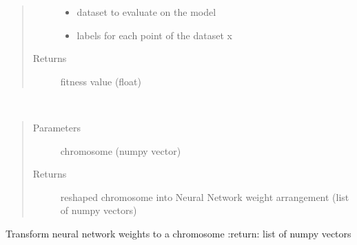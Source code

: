 \documentclass[letterpaper,10pt,english]{sphinxmanual}
\begin{document}
\begin{fulllineitems}
\begin{fulllineitems}
\begin{quote}
\begin{description}
\begin{itemize}
\item {} 
 \textendash{} dataset to evaluate on the model

\item {} 
 \textendash{} labels for each point of the dataset x

\end{itemize}

\item[{Returns}] \leavevmode
fitness value (float)

\end{description}\end{quote}

\end{fulllineitems}


\begin{fulllineitems}
\label{\detokenize{index:genetic_optimizer.GeneticNeuralWeightOptimizer.transform_weights}}~\begin{quote}\begin{description}
\item[{Parameters}] \leavevmode
{} \textendash{} chromosome (numpy vector)

\item[{Returns}] \leavevmode
reshaped chromosome into Neural Network weight arrangement (list of numpy vectors)

\end{description}\end{quote}

\end{fulllineitems}


\begin{fulllineitems}
\label{\detokenize{index:genetic_optimizer.GeneticNeuralWeightOptimizer.weights_to_vector}}
Transform neural network weights to a chromosome
:return: list of numpy vectors


\end{fulllineitems}
\end{fulllineitems}
\end{document}
